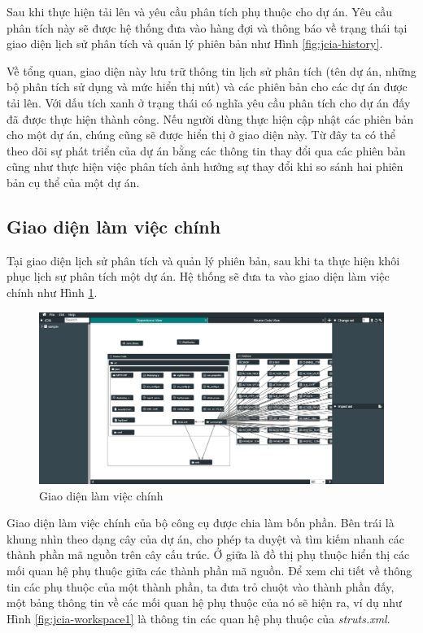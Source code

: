\documentclass[12pt]{report}
\begin{document}
Sau khi thực hiện tải lên và yêu cầu phân tích phụ thuộc cho dự án. Yêu cầu phân tích này sẽ được hệ thống đưa vào hàng đợi và thông báo về trạng thái tại giao diện lịch sử phân tích và quản lý phiên bản như Hình \ref{fig:jcia-history}.

Về tổng quan, giao diện này lưu trữ thông tin lịch sử phân tích (tên dự án, những bộ phân tích sử dụng và mức hiển thị nút) và các phiên bản cho các dự án được tải lên. Với dấu tích xanh ở trạng thái có nghĩa yêu cầu phân tích cho dự án đấy đã được thực hiện thành công. Nếu người dùng thực hiện cập nhật các phiên bản cho một dự án, chúng cũng sẽ được hiển thị ở giao diện này. Từ đây ta có thể theo dõi sự phát triển của dự án bằng các thông tin thay đổi qua các phiên bản cũng như thực hiện việc phân tích ảnh hưởng sự thay đổi khi so sánh hai phiên bản cụ thể của một dự án.

\subsection{Giao diện làm việc chính}
Tại giao diện lịch sử phân tích và quản lý phiên bản, sau khi ta thực hiện khôi phục lịch sự phân tích một dự án. Hệ thống sẽ đưa ta vào giao diện làm việc chính như Hình \ref{fig:jcia-workspace}.

\begin{figure}[h]
	\centering
	\includegraphics[width=1.0\linewidth]{jcia-workspace}
	\caption{Giao diện làm việc chính}
	\label{fig:jcia-workspace}
\end{figure}

Giao diện làm việc chính của bộ công cụ được chia làm bốn phần. Bên trái là khung nhìn theo dạng cây của dự án, cho phép ta duyệt và tìm kiếm nhanh các thành phần mã nguồn trên cây cấu trúc. Ở giữa là đồ thị phụ thuộc hiển thị các mối quan hệ phụ thuộc giữa các thành phần mã nguồn. Để xem chi tiết về thông tin các phụ thuộc của một thành phần, ta đưa trỏ chuột vào thành phần đấy, một bảng thông tin về các mối quan hệ phụ thuộc của nó sẽ hiện ra, ví dụ như Hình \ref{fig:jcia-workspace1} là thông tin các quan hệ phụ thuộc của \textit{struts.xml}.
\end{document}
